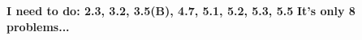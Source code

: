 \documentclass[a4paper,14pt]{article}
\begin{document}
 
 \Large \textbf{I need to do: 2.3, 3.2, 3.5(B), 4.7, 5.1, 5.2, 5.3, 5.5}
 \newline \textbf{It's only 8 problems...}
 \normalsize
 
 \tableofcontents
 
 
 
 
 
 
 
 
 
\end{document}
